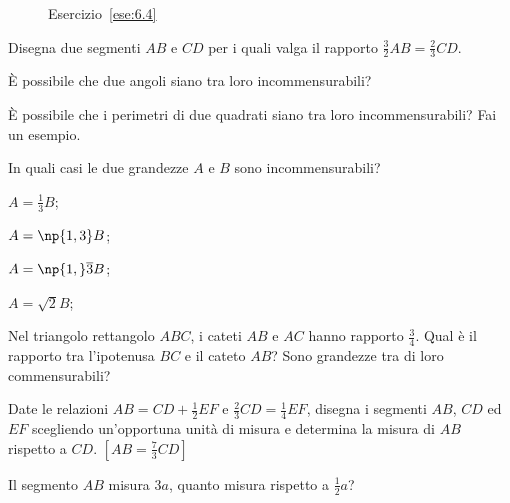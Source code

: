 \begin{figure}[!htb]
	\centering
	\caption{Esercizio~\ref{ese:6.4}}\label{fig:ese6.4}
\end{figure}

\begin{esercizio}
\label{ese:6.5}
Disegna due segmenti $AB$ e $CD$ per i quali valga il rapporto $\frac{3}{2}AB=\frac{2}{3}CD$.
\end{esercizio}

\begin{esercizio}
\label{ese:6.6}
\`E possibile che due angoli siano tra loro incommensurabili?
\end{esercizio}

\begin{esercizio}
\label{ese:6.7}
\`E possibile che i perimetri di due quadrati siano tra loro incommensurabili? Fai un esempio.
\end{esercizio}

\begin{esercizio}
\label{ese:6.8}
In quali casi le due grandezze $A$ e $B$ sono incommensurabili?
\begin{multicols}{4}
\begin{enumeratea}
\item $A=\frac{1}{3}B$;
\item $A=\np{1,3}B$;
\item $A=\np{1,}\overline{3}B$;
\item $A=\sqrt{2}B$;
\end{enumeratea}
\end{multicols}
\end{esercizio}

\begin{esercizio}
\label{ese:6.9}
Nel triangolo rettangolo $ABC$, i cateti $AB$ e $AC$ hanno rapporto $\frac{3}{4}$. Qual è il rapporto tra  l'ipotenusa $BC$ e il cateto $AB$? Sono grandezze tra di loro commensurabili?
\end{esercizio}

\begin{esercizio}
\label{ese:6.10}
Date le relazioni $AB=CD+\frac{1}{2}EF$ e $\frac{2}{3}CD=\frac{1}{4}EF$, disegna i segmenti $AB$, $CD$ ed $EF$ scegliendo un'opportuna unità di misura e determina la misura di $AB$ rispetto a $CD$. $[AB=\frac{7}{3}CD]$
\end{esercizio}

\begin{esercizio}
\label{ese:6.11}
Il segmento $AB$ misura $3a$, quanto misura rispetto a $\frac{1}{2}a$? 
\end{esercizio}

